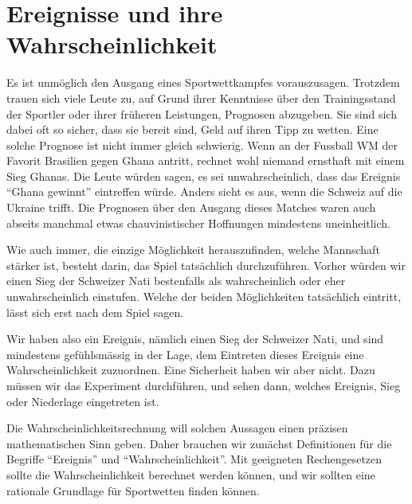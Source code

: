 %
%
%
\chapter{Ereignisse und ihre Wahrscheinlichkeit} \label{chapter-ereignisse-und-wahrscheinlichkeit}

Es ist unmöglich den Ausgang eines Sportwettkampfes vorauszusagen.
Trotzdem trauen sich viele Leute zu, auf Grund ihrer Kenntnisse über den
Trainingsstand der Sportler oder ihrer früheren Leistungen,
Prognosen abzugeben.
Sie sind sich dabei oft so sicher, dass sie bereit sind, Geld auf ihren Tipp
zu wetten.
Eine solche Prognose ist nicht immer gleich schwierig.
Wenn an der
Fussball WM der Favorit Brasilien gegen Ghana antritt,
rechnet wohl niemand ernsthaft mit einem Sieg Ghanas.
Die Leute würden
sagen, es sei unwahrscheinlich, dass das Ereignis ``Ghana gewinnt'' eintreffen
würde.
Anders sieht es aus, wenn die Schweiz auf die Ukraine trifft.
Die Prognosen über den Ausgang dieses Matches waren auch abseits
manchmal etwas chauvinistischer Hoffnungen mindestens uneinheitlich.

Wie auch immer, die einzige Möglichkeit herauszufinden, welche Mannschaft
stärker ist, besteht darin, das Spiel tatsächlich durchzuführen.
Vorher würden wir einen Sieg der Schweizer Nati bestenfalls als
wahrscheinlich oder eher unwahrscheinlich einstufen.
Welche der beiden Möglichkeiten tatsächlich eintritt, lässt sich
erst nach dem Spiel sagen.

Wir haben also ein Ereignis, nämlich einen Sieg der Schweizer Nati,
und sind mindestens gefühlsmässig in der Lage, dem Eintreten dieses
Ereignis eine Wahrscheinlichkeit zuzuordnen.
Eine Sicherheit haben wir aber nicht.
Dazu müssen wir das Experiment durchführen, und sehen dann,
welches Ereignis, Sieg oder Niederlage eingetreten ist.

Die Wahrscheinlichkeitsrechnung will solchen Aussagen einen präzisen
mathematischen Sinn geben.
Daher brauchen wir zunächst Definitionen
für die Begriffe ``Ereignis'' und ``Wahrscheinlichkeit''.
Mit geeigneten
Rechengesetzen sollte die Wahrscheinlichkeit berechnet werden können,
und wir sollten eine rationale Grundlage für Sportwetten finden können.

